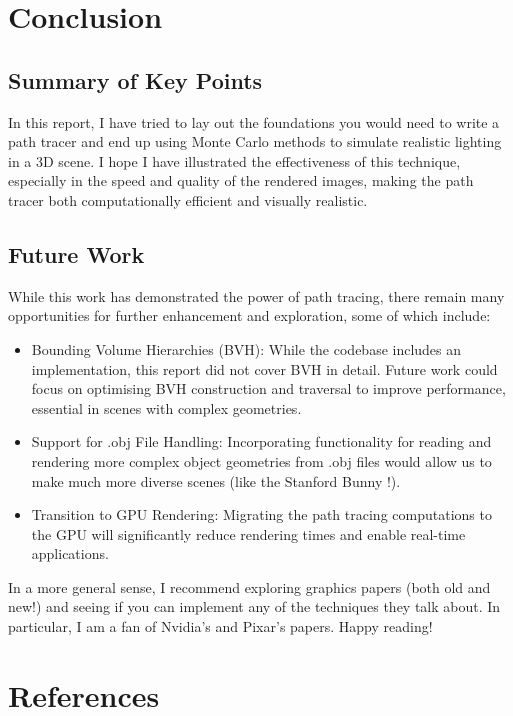 \documentclass[12pt]{article}
\begin{document}
\section{Conclusion}
\label{sec:conclusion}
\subsection{Summary of Key Points}
In this report, I have tried to lay out the foundations you would need to write a path tracer and end up using Monte Carlo methods to simulate realistic lighting in a 3D scene. I hope I have illustrated the effectiveness of this technique, especially in the speed and quality of the rendered images, making the path tracer both computationally efficient and visually realistic.

\subsection{Future Work}

While this work has demonstrated the power of path tracing, there remain many opportunities for further enhancement and exploration, some of which include:
\begin{itemize}
    \item Bounding Volume Hierarchies (BVH): While the codebase includes an implementation, this report did not cover BVH in detail. Future work could focus on optimising BVH construction and traversal to improve performance, essential in scenes with complex geometries.

    \item Support for .obj File Handling: Incorporating functionality for reading and rendering more complex object geometries from .obj files would allow us to make much more diverse scenes (like the Stanford Bunny \cite{stanfordbunny}!).

    \item Transition to GPU Rendering: Migrating the path tracing computations to the GPU will significantly reduce rendering times and enable real-time applications.
\end{itemize}

In a more general sense, I recommend exploring graphics papers (both old and new!) and seeing if you can implement any of the techniques they talk about. In particular, I am a fan of Nvidia's and Pixar's papers. Happy reading!

\section{References}
\label{sec:references}


\end{document}
